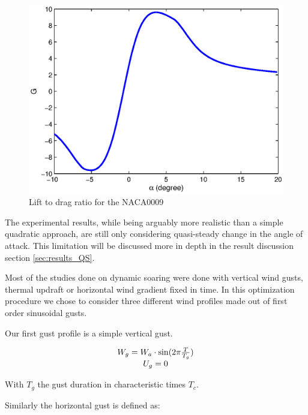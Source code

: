 \begin{figure}[ht]
\begin{center}
   \includegraphics{./Figures/NACA0009_steady_map_G.eps}
\end{center}
\caption{Lift to drag ratio for the NACA0009}
\label{fig:G_vs_alpha_qs}
\end{figure}

\par The experimental results, while being arguably more realistic than a simple quadratic approach, are still only considering quasi-steady change in the angle of attack.
This limitation will be discussed more in depth in the result discussion section \ref{sec:results_QS}.

\FloatBarrier
{}
Most of the studies done on dynamic soaring were done with vertical wind gusts, thermal updraft or horizontal wind gradient fixed in time.
In this optimization procedure we chose to consider three different wind profiles made out of first order sinusoidal gusts.

\par Our first gust profile is a simple vertical gust.

\begin{equation}
\begin{array}[c]{c}
    W_g = W_a \cdot \sin(2\pi \frac{T}{T_g}) \\
  U_g = 0 
\end{array}
\label{eqn:vertical_gust_definition}
\end{equation}

With $T_g$ the gust duration in characteristic times $T_c$.
\par Similarly the horizontal gust is defined as:

